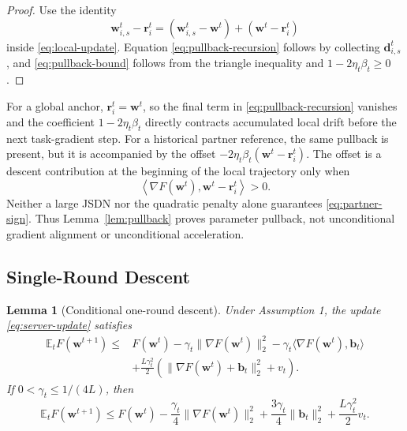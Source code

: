\documentclass[journal,twoside,web]{ieeecolor}
\newtheorem{lemma}{Lemma}
\begin{document}
\begin{proof}
Use the identity
\begin{equation}
 \bm w_{i,s}^{t}-\bm r_i^t
 =(\bm w_{i,s}^{t}-\bm w^t)+(\bm w^t-\bm r_i^t)
\end{equation}
inside \eqref{eq:local-update}. Equation
\eqref{eq:pullback-recursion} follows by collecting
$\bm d_{i,s}^{t}$, and \eqref{eq:pullback-bound} follows from the triangle
inequality and $1-2\eta_t\beta_t\geq0$.
\end{proof}

For a global anchor, $\bm r_i^t=\bm w^t$, so the final term in
\eqref{eq:pullback-recursion} vanishes and the coefficient
$1-2\eta_t\beta_t$ directly contracts accumulated local drift before the next
task-gradient step. For a historical partner reference, the same pullback is
present, but it is accompanied by the offset
$-2\eta_t\beta_t(\bm w^t-\bm r_i^t)$. The offset is a descent contribution
at the beginning of the local trajectory only when
\begin{equation}
 \left\langle\nabla F(\bm w^t),\bm w^t-\bm r_i^t\right\rangle>0.          \label{eq:partner-sign}
\end{equation}
Neither a large JSDN nor the quadratic penalty alone guarantees
\eqref{eq:partner-sign}. Thus Lemma~\ref{lem:pullback} proves parameter
pullback, not unconditional gradient alignment or unconditional acceleration.

\subsection{Single-Round Descent}

\begin{lemma}[Conditional one-round descent]                             \label{lem:one-round}
Under Assumption 1, the update \eqref{eq:server-update} satisfies
\begin{align}
 \mathbb E_t F(\bm w^{t+1})
 \leq{}&F(\bm w^t)-\gamma_t\|\nabla F(\bm w^t)\|_2^2
 -\gamma_t\langle\nabla F(\bm w^t),\bm b_t\rangle \nonumber\\
 &+\frac{L\gamma_t^2}{2}
 \left(\|\nabla F(\bm w^t)+\bm b_t\|_2^2+v_t\right).   \label{eq:exact-one-round}
\end{align}
If $0<\gamma_t\leq1/(4L)$, then
\begin{equation}
 \mathbb E_t F(\bm w^{t+1})
 \leq F(\bm w^t)
 -\frac{\gamma_t}{4}\|\nabla F(\bm w^t)\|_2^2
 +\frac{3\gamma_t}{4}\|\bm b_t\|_2^2
 +\frac{L\gamma_t^2}{2}v_t.                            \label{eq:robust-one-round}
\end{equation}
\end{lemma}
\end{document}

